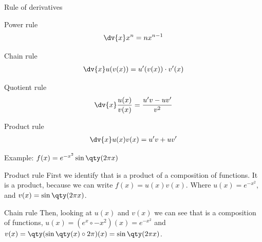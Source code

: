 \documentclass[../tufte-style.tex]{standalone}
\begin{document}
\date{February 24, 2026}

\begin{frame}{Rule of derivatives}

\begin{minipage}{0.45\textwidth}
    \centering
    \begin{block}{Power rule}
        \begin{gather*}
            \dv{x}x^{n} = nx^{n-1}
        \end{gather*}
    \end{block}
\end{minipage}
\hfill
\begin{minipage}{0.45\textwidth}
    \centering
    \begin{block}{Chain rule}
        \begin{gather*}
            \dv{x}u(v(x)) = u'(v(x))\cdot v'(x)
        \end{gather*}
    \end{block}
\end{minipage}


\begin{minipage}{0.45\textwidth}
    \centering
    \begin{block}{Quotient rule}
        \begin{gather*}
            \dv{x}\frac{u(x)}{v(x)} = \frac{u'v - uv'}{v^{2}} 
        \end{gather*}
    \end{block}
\end{minipage}
\hfill
\begin{minipage}{0.45\textwidth}
    \centering
    \begin{block}{Product rule}
        \begin{gather*}
            \dv{x}u(x)v(x) = u'v + uv'
        \end{gather*}
    \end{block}
\end{minipage}

\end{frame}

\begin{frame}{Example: \(f(x) = e^{-x^2}\sin\qty(2\pi x)\) }

\begin{block}{Product rule}
First we identify that is a product of a composition of functions.
It is a product, because we can write \(f(x) = u(x)v(x)\).
Where \(u(x)=e^{-x^2}\), and \(v(x)=\sin\qty(2\pi x)\).
\end{block}

\vspace{2em}

\begin{block}{Chain rule}
Then, looking at \(u(x)\) and \(v(x)\) we can see that is a composition of functions,
\(u(x)=(e^{x}\circ -x^{2})(x) = e^{-x^2}\) and \(v(x)=\qty(\sin\qty(x)\circ2\pi)(x)=\sin\qty(2\pi x)\).
\end{block}

\end{frame}
\end{document}
